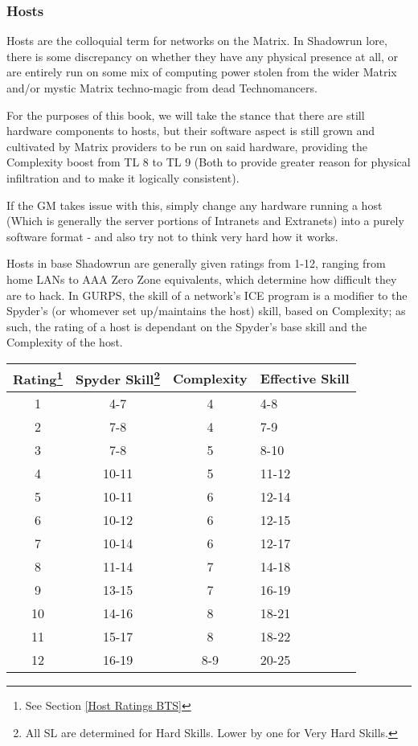 \begin{multicols}{3}
	\subsubsection{Hosts}
	
	Hosts are the colloquial term for networks on the Matrix. In Shadowrun lore, there is some discrepancy on whether they have any physical presence at all, or are entirely run on some mix of computing power stolen from the wider Matrix and/or mystic Matrix techno-magic from dead Technomancers. 
	
	For the purposes of this book, we will take the stance that there are still hardware components to hosts, but their software aspect is still grown and cultivated by Matrix providers to be run on said hardware, providing the Complexity boost from TL 8 to TL 9 (Both to provide greater reason for physical infiltration and to make it logically consistent). 
	
	If the GM takes issue with this, simply change any hardware running a host (Which is generally the server portions of Intranets and Extranets) into a purely software format - and also try not to think very hard how it works.
	
	Hosts in base Shadowrun are generally given ratings from 1-12, ranging from home LANs to AAA Zero Zone equivalents, which determine how difficult they are to hack. In GURPS, the skill of a network's ICE program is a modifier to the Spyder's (or whomever set up/maintains the host) skill, based on Complexity; as such, the rating of a host is dependant on the Spyder's base skill and the Complexity of the host.
	
	\begin{center}
		\begin{tabularx}{0.47\textwidth}{|c|c|c|X|}
			\hline
			Rating\footnote{See Section \ref{Host Ratings BTS}} & Spyder Skill\footnote{All SL are determined for Hard Skills. Lower by one for Very Hard Skills. } & Complexity & Effective Skill \\
			\hline
			\hline
			1 & 4-7 & 4 & 4-8 \\
			2 & 7-8 & 4 & 7-9 \\
			3 & 7-8 & 5 & 8-10 \\
			4 & 10-11 & 5 & 11-12 \\
			5 & 10-11 & 6 & 12-14 \\
			6 & 10-12 & 6 & 12-15 \\
			7 & 10-14 & 6 & 12-17 \\
			8 & 11-14 & 7 & 14-18 \\
			9 & 13-15 & 7 & 16-19 \\
			10 & 14-16 & 8 & 18-21 \\
			11 & 15-17 & 8 & 18-22 \\
			12 & 16-19 & 8-9 & 20-25\\
			\hline
		\end{tabularx}
	\end{center}


\end{multicols}
